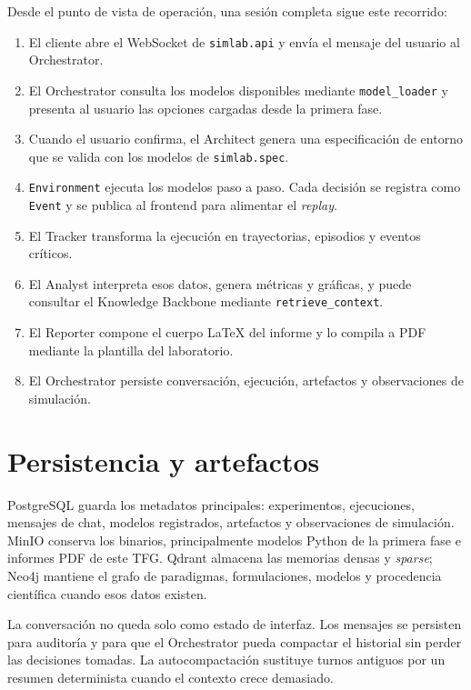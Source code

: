 Desde el punto de vista de operación, una sesión completa sigue este recorrido:

\begin{enumerate}
\item El cliente abre el WebSocket de \texttt{simlab.api} y envía el mensaje
del usuario al Orchestrator.
\item El Orchestrator consulta los modelos disponibles mediante
\texttt{model\_loader} y presenta al usuario las opciones cargadas desde la
primera fase.
\item Cuando el usuario confirma, el Architect genera una especificación de
entorno que se valida con los modelos de \texttt{simlab.spec}.
\item \texttt{Environment} ejecuta los modelos paso a paso. Cada decisión se
registra como \texttt{Event} y se publica al frontend para alimentar el
\textit{replay}.
\item El Tracker transforma la ejecución en trayectorias, episodios y eventos
críticos.
\item El Analyst interpreta esos datos, genera métricas y gráficas, y puede
consultar el Knowledge Backbone mediante \texttt{retrieve\_context}.
\item El Reporter compone el cuerpo LaTeX del informe y lo compila a PDF
mediante la plantilla del laboratorio.
\item El Orchestrator persiste conversación, ejecución, artefactos y
observaciones de simulación.
\end{enumerate}

\section{Persistencia y artefactos}

PostgreSQL guarda los metadatos principales: experimentos, ejecuciones,
mensajes de chat, modelos registrados, artefactos y observaciones de
simulación. MinIO conserva los binarios, principalmente modelos Python de la
primera fase e informes PDF de este TFG. Qdrant almacena las memorias densas y
\textit{sparse}; Neo4j mantiene el grafo de paradigmas, formulaciones, modelos
y procedencia científica cuando esos datos existen.

La conversación no queda solo como estado de interfaz. Los mensajes se
persisten para auditoría y para que el Orchestrator pueda compactar el
historial sin perder las decisiones tomadas. La autocompactación sustituye
turnos antiguos por un resumen determinista cuando el contexto crece demasiado.

